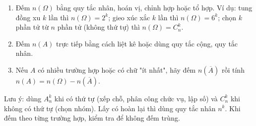 \begin{enumerate}
\item Đếm $n(\Omega)$ bằng quy tắc nhân, hoán vị, chỉnh hợp hoặc tổ hợp. Ví dụ: tung đồng xu $k$ lần thì $n(\Omega)=2^k$; gieo xúc xắc $k$ lần thì $n(\Omega)=6^k$; chọn $k$ phần tử từ $n$ phần tử (không thứ tự) thì $n(\Omega)=C_n^k$.
\item Đếm $n(A)$ trực tiếp bằng cách liệt kê hoặc dùng quy tắc cộng, quy tắc nhân.
\item Nếu $A$ có nhiều trường hợp hoặc có chữ "ít nhất", hãy đếm $n\left(\overline{A}\right)$ rồi tính $n(A)=n(\Omega)-n\left(\overline{A}\right)$.
\end{enumerate}
Lưu ý: dùng $A_n^k$ khi có thứ tự (xếp chỗ, phân công chức vụ, lập số) và $C_n^k$ khi không có thứ tự (chọn nhóm). Lấy có hoàn lại thì dùng quy tắc nhân $n^k$. Khi đếm theo từng trường hợp, kiểm tra để không đếm trùng.
